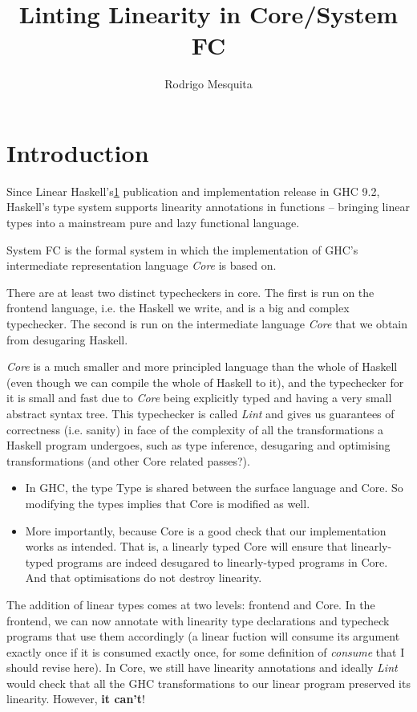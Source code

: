 \documentclass{article}
\title{Linting Linearity in Core/System FC}
\author{Rodrigo Mesquita}
\begin{document}
\maketitle

\section{Introduction}

Since Linear Haskell's\ref{}
publication and implementation release in GHC 9.2, Haskell's type system
supports linearity annotations in functions -- bringing linear types into a
mainstream pure and lazy functional language.

System FC is the formal system in which the implementation of GHC's intermediate
representation language \emph{Core} is based on.

There are at least two distinct typecheckers in core. The first is run on the frontend
language, i.e. the Haskell we write, and is a big and complex typechecker. The
second is run on the intermediate language \emph{Core} that we obtain from
desugaring Haskell.

\emph{Core} is a much smaller and more principled language than the whole of
Haskell (even though we can compile the whole of Haskell to it), and the
typechecker for it is small and fast due to \emph{Core} being explicitly typed
and having a very small abstract syntax tree. This typechecker is called
\emph{Lint} and gives us guarantees of correctness (i.e. sanity) in face of
the complexity of all the transformations a Haskell program undergoes, such as
type inference, desugaring and optimising transformations (and other Core
related passes?).

\begin{itemize}
    \item In GHC, the type Type is shared between the surface language and Core.
        So modifying the types implies that Core is modified as well. 

    \item More importantly, because Core is a good check that our implementation
        works as intended. That is, a linearly typed Core will ensure that
        linearly-typed programs are indeed desugared to linearly-typed programs
        in Core. And that optimisations do not destroy linearity.
\end{itemize}

The addition of linear types comes at two levels: frontend and Core.
In the frontend, we can now annotate with linearity type declarations and
typecheck programs that use them accordingly (a linear fuction will consume its
argument exactly once if it is consumed exactly once, for some definition of
\emph{consume} that I should revise here). In Core, we still have linearity
annotations and ideally \emph{Lint} would check that all the GHC transformations
to our linear program preserved its linearity. However, \textbf{it can't}!
\end{document}
